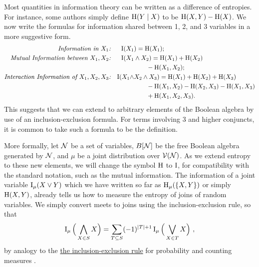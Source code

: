\documentclass[the-pdg-manual.tex]{subfiles}
\begin{document}
    Most quantities in information theory can be written as a difference of entropies.
    For instance, some authors simply define $\operatorname{\mathrm{H}}(Y \mid X)$ to be $\operatorname{\mathrm{H}}(X,Y) - \operatorname{\mathrm{H}}(X)$.
    We now write the formulas for information shared between 1, 2, and 3 variables in a more suggestive form.
    \begin{align*}
        \textit{Information in $X_1$:}  && \operatorname{\mathrm{I}}(X_1 &) = \operatorname{\mathrm{H}}(X_1) ;\\
        \textit{Mutual Information between $X_1, X_2$:} && \operatorname{\mathrm{I}}(X_1 &\land X_2) = \operatorname{\mathrm{H}}(X_1) + \operatorname{\mathrm{H}}(X_2)  \\
             &&&\qquad - \operatorname{\mathrm{H}}(X_1, X_2); \\
         \textit{Interaction Information of $X_1, X_2, X_3$:}&&\operatorname{\mathrm{I}}(X_1 \land &X_2 \land X_3) = \operatorname{\mathrm{H}}(X_1) + \operatorname{\mathrm{H}}(X_2) + \operatorname{\mathrm{H}}(X_3) \\
            &&&\qquad - \operatorname{\mathrm{H}}(X_1, X_2) - \operatorname{\mathrm{H}}(X_2, X_3) - \operatorname{\mathrm{H}}(X_1, X_3) \\
            &&&\qquad  + \operatorname{\mathrm{H}}(X_1, X_2, X_3)  .\\
    \end{align*}
    This suggests that we can extend to arbitrary elements of the Boolean algebra by use of an inclusion-exclusion formula. For terms involving 3 and higher conjuncts, it is common to take such a formula to be the definition.

    More formally, let $\mathcal N$ be a set of variables, $B[\mathcal N]$ be the free Boolean algebra generated by $\mathcal N$, and $\mu$ be a joint distribution over $\mathcal V(\mathcal N)$. As we extend entropy to these new elements, we will change the symbol $\operatorname{\mathrm{H}}$ to $\operatorname{\mathrm{I}}$, for compatibility with the standard notation, such as the mutual information. The information of a joint variable $\operatorname{\mathrm{I}}_\mu(X \lor Y)$ which we have written so far as $\operatorname{\mathrm{H}}_\mu(\{X,Y\})$ or simply $\operatorname{\mathrm{H}}(X,Y)$, already tells us how to measure the entropy of joins of random variables. We simply convert meets to joins using the inclusion-exclusion rule, so that
    \begin{equation}\label{eq:inclexcl}
        \operatorname{\mathrm{I}}_\mu\Big(\bigwedge_{X \in S} X\Big) =  \sum_{T \subseteq S} (-1)^{|T|+1} \operatorname{\mathrm{I}}_\mu\Big( \bigvee_{X \in T} X \Big) ~,
    \end{equation}
    by analogy to the
    \href{https://en.wikipedia.org/wiki/Inclusion%E2%80%93exclusion_principle}
        {the inclusion-exclusion rule} for probability and counting measures \cite[eq 2.7]{halpern2017reasoning}.
\end{document}
